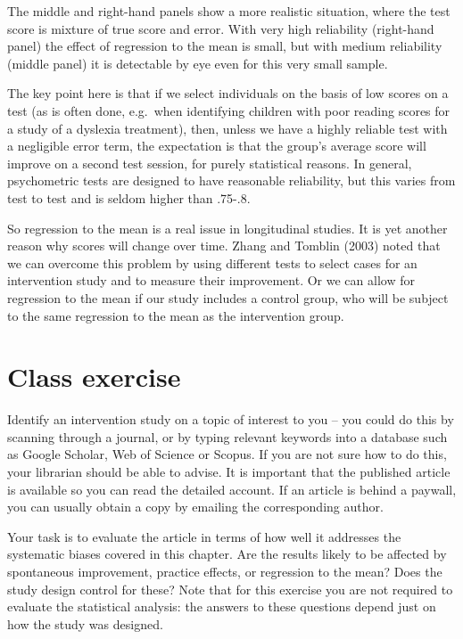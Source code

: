 \documentclass[]{book}
\begin{document}
The middle and right-hand panels show a more realistic situation, where the test score is mixture of true score and error. With very high reliability (right-hand panel) the effect of regression to the mean is small, but with medium reliability (middle panel) it is detectable by eye even for this very small sample.

The key point here is that if we select individuals on the basis of low scores on a test (as is often done, e.g.~when identifying children with poor reading scores for a study of a dyslexia treatment), then, unless we have a highly reliable test with a negligible error term, the expectation is that the group's average score will improve on a second test session, for purely statistical reasons. In general, psychometric tests are designed to have reasonable reliability, but this varies from test to test and is seldom higher than .75-.8.

So regression to the mean is a real issue in longitudinal studies. It is yet another reason why scores will change over time. Zhang and Tomblin (2003) noted that we can overcome this problem by using different tests to select cases for an intervention study and to measure their improvement. Or we can allow for regression to the mean if our study includes a control group, who will be subject to the same regression to the mean as the intervention group.

\hypertarget{class-exercise-1}{%
\section{Class exercise}\label{class-exercise-1}}

Identify an intervention study on a topic of interest to you -- you could do this by scanning through a journal, or by typing relevant keywords into a database such as Google Scholar, Web of Science or Scopus. If you are not sure how to do this, your librarian should be able to advise. It is important that the published article is available so you can read the detailed account. If an article is behind a paywall, you can usually obtain a copy by emailing the corresponding author.

Your task is to evaluate the article in terms of how well it addresses the systematic biases covered in this chapter. Are the results likely to be affected by spontaneous improvement, practice effects, or regression to the mean? Does the study design control for these? Note that for this exercise you are not required to evaluate the statistical analysis: the answers to these questions depend just on how the study was designed. 
\end{document}
